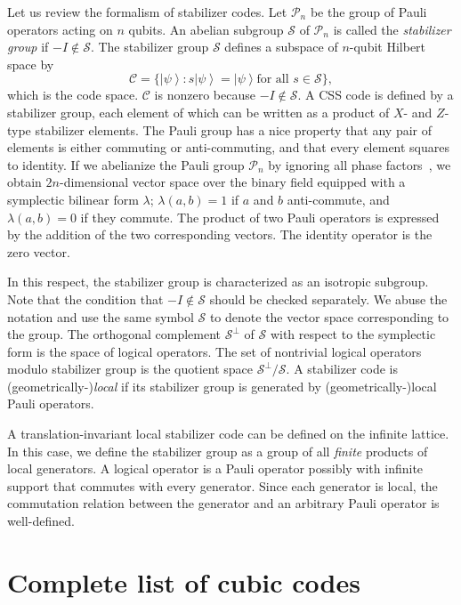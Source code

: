 \documentclass[letterpaper,10pt,pra,aps,showpacs,twocolumn]{revtex4-1}
\theoremstyle{definition} \newtheorem{defn}{Definition}
\theoremstyle{definition} \newtheorem{remark}{Remark}
\newcommand{\ket}[1]{\left| #1 \right\rangle}
\begin{document}
Let us review the formalism of stabilizer codes. Let $\mathcal{P}_n$ be the group of Pauli operators acting on $n$ qubits. An abelian subgroup $\mathcal{S}$ of $\mathcal{P}_n$ is called the \emph{stabilizer group} if $ -I \notin \mathcal{S}$. The stabilizer group $\mathcal{S}$ defines a subspace of $n$-qubit Hilbert space by
\[
 \mathcal{C} = \{ \ket{\psi} : s \ket{\psi} = \ket{\psi} \text{for all } s \in \mathcal{S} \},
\]
which is the code space. $\mathcal{C}$ is nonzero because $-I \notin \mathcal{S}$. A CSS code is defined by a stabilizer group, each element of which can be written as a product of $X$- and $Z$- type stabilizer elements. The Pauli group has a nice property that any pair of elements is either commuting or anti-commuting, and that every element squares to identity. If we abelianize the Pauli group $\mathcal{P}_n$ by ignoring all phase factors~\cite{CalderbankRainsShorEtAl1997Quantum}, we obtain $2n$-dimensional vector space over the binary field equipped with a symplectic bilinear form $\lambda$; $\lambda(a,b) = 1$ if $a$ and $b$ anti-commute, and $\lambda(a,b)=0$ if they commute. The product of two Pauli operators is expressed by the addition of the two corresponding vectors. The identity operator is the zero vector.

In this respect, the stabilizer group is characterized as an isotropic subgroup. Note that the condition that $-I \notin \mathcal{S}$ should be checked separately. We abuse the notation and use the same symbol $\mathcal{S}$ to denote the vector space corresponding to the group. The orthogonal complement $\mathcal{S}^\perp$ of $\mathcal{S}$ with respect to the symplectic form is the space of logical operators. The set of nontrivial logical operators modulo stabilizer group is the quotient space $\mathcal{S}^\perp / \mathcal{S}$. A stabilizer code is (geometrically-)\emph{local} if its stabilizer group is generated by (geometrically-)local Pauli operators.

A translation-invariant local stabilizer code can be defined on the infinite lattice. In this case, we define the stabilizer group as a group of all \emph{finite} products of local generators. A logical operator is a Pauli operator possibly with infinite support that commutes with every generator. Since each generator is local, the commutation relation between the generator and an arbitrary Pauli operator is well-defined.


\section{Complete list of cubic codes}
\label{section:list_cubic_codes}
\end{document}
